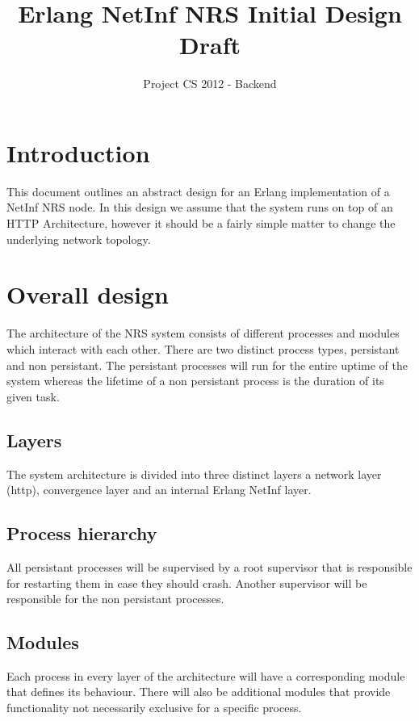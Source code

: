 \documentclass[11pt]{article}
\title{Erlang NetInf NRS Initial Design Draft}
\author{Project CS 2012 - Backend}
\date{}
\begin{document}
\maketitle

\section*{Introduction}
This document outlines an abstract design for an Erlang implementation of a NetInf NRS node. In this design we assume that the system runs on top of an HTTP Architecture, however it should be a fairly simple matter to change the underlying network topology.

\section*{Overall design}

The architecture of the NRS system consists of different processes and modules which interact with each other. There are two distinct process types, persistant and non persistant. The persistant processes will run for the entire uptime of the system whereas the lifetime of a non persistant process is the duration of its given task.

\subsection*{Layers}
The system architecture is divided into three distinct layers a network layer (http), convergence layer and an internal Erlang NetInf layer.   

\subsection*{Process hierarchy}
All persistant processes will be supervised by a root supervisor that is responsible for restarting them in case they should crash. Another supervisor will be responsible for the non persistant processes. 

\subsection*{Modules}
Each process in every layer of the architecture will have a corresponding module that defines its behaviour. There will also be additional modules that provide functionality not necessarily exclusive for a specific process. 
\end{document}
